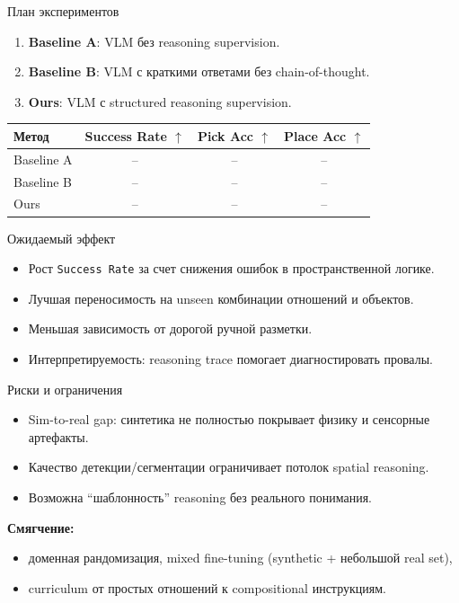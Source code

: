 \documentclass[aspectratio=169]{beamer}
\begin{document}
\begin{frame}{План экспериментов}
\begin{enumerate}
    \item \textbf{Baseline A}: VLM без reasoning supervision.
    \item \textbf{Baseline B}: VLM с краткими ответами без chain-of-thought.
    \item \textbf{Ours}: VLM с structured reasoning supervision.
\end{enumerate}

\vspace{0.5em}
\begin{table}
\centering
\small
\begin{tabular}{lccc}
\toprule
Метод & Success Rate $\uparrow$ & Pick Acc $\uparrow$ & Place Acc $\uparrow$ \\
\midrule
Baseline A & -- & -- & -- \\
Baseline B & -- & -- & -- \\
Ours & -- & -- & -- \\
\bottomrule
\end{tabular}
\end{table}
\end{frame}

\begin{frame}{Ожидаемый эффект}
\begin{itemize}
    \item Рост \texttt{Success Rate} за счет снижения ошибок в пространственной логике.
    \item Лучшая переносимость на unseen комбинации отношений и объектов.
    \item Меньшая зависимость от дорогой ручной разметки.
    \item Интерпретируемость: reasoning trace помогает диагностировать провалы.
\end{itemize}
\end{frame}

\begin{frame}{Риски и ограничения}
\begin{itemize}
    \item Sim-to-real gap: синтетика не полностью покрывает физику и сенсорные артефакты.
    \item Качество детекции/сегментации ограничивает потолок spatial reasoning.
    \item Возможна ``шаблонность'' reasoning без реального понимания.
\end{itemize}

\vspace{0.5em}
\textbf{Смягчение:}
\begin{itemize}
    \item доменная рандомизация, mixed fine-tuning (synthetic + небольшой real set),
    \item curriculum от простых отношений к compositional инструкциям.
\end{itemize}
\end{frame}
\end{document}
